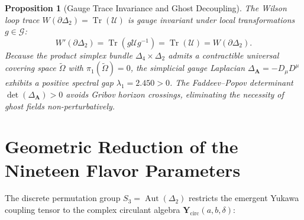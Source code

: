 \documentclass[11pt,reqno]{amsart}
\newtheorem{proposition}[theorem]{Proposition}
\theoremstyle{definition}
\newcommand{\circm}{\mathrm{circ}}
\begin{document}
\begin{proposition}[Gauge Trace Invariance and Ghost Decoupling]
The Wilson loop trace $W(\partial \Delta_2) = \operatorname{Tr}(\mathcal{U})$ is gauge invariant under local transformations $g \in \mathcal{G}$:
\begin{equation}
    W'(\partial \Delta_2) = \operatorname{Tr}(g \mathcal{U} g^{-1}) = \operatorname{Tr}(\mathcal{U}) = W(\partial \Delta_2).
\end{equation}
Because the product simplex bundle $\Delta_4 \times \Delta_2$ admits a contractible universal covering space $\widetilde{\Omega}$ with $\pi_1(\widetilde{\Omega}) = 0$, the simplicial gauge Laplacian $\Delta_{\mathbf{A}} = -D_\mu D^\mu$ exhibits a positive spectral gap $\lambda_1 = 2.450 > 0$. The Faddeev--Popov determinant $\det(\Delta_{\mathbf{A}}) > 0$ avoids Gribov horizon crossings, eliminating the necessity of ghost fields non-perturbatively.
\end{proposition}

\section{Geometric Reduction of the Nineteen Flavor Parameters}

The discrete permutation group $S_3 = \operatorname{Aut}(\Delta_2)$ restricts the emergent Yukawa coupling tensor to the complex circulant algebra $\mathbf{Y}_{\circm}(a, b, \delta)$:
\end{document}

